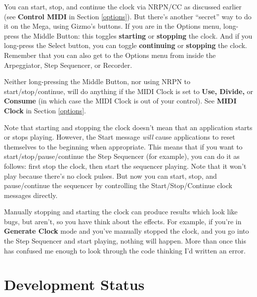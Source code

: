 \documentclass{article}
\begin{document}
		You can start, stop, and continue the clock via NRPN/CC as discussed earlier (see {\bf Control MIDI} in Section \ref{options}).   But there's another ``secret'' way to do it on the Mega, using Gizmo's buttons.  If you are in the Options menu, long-press the Middle Button: this toggles {\bf starting} or {\bf stopping} the clock.  And if you long-press the Select button, you can toggle {\bf continuing} or {\bf stopping} the clock.  Remember that you can also get to the Options menu from inside the Arpeggiator, Step Sequencer, or Recorder.
		
		Neither long-pressing the Middle Button, nor using NRPN to start/stop/continue, will do anything if the MIDI Clock is set to {\bf Use, Divide,} or {\bf Consume} (in which case the MIDI Clock is out of your control).  See {\bf MIDI Clock} in Section \ref{options}.
				
		Note that starting and stopping the clock doesn't mean that an application starts or stops playing.  However, the Start message {\it will} cause applications to reset themselves to the beginning when appropriate.   This means that if you want to start/stop/pause/continue the Step Sequencer (for example), you can do it as follows: first stop the clock, then start the sequencer playing.  Note that it won't play because there's no clock pulses.  But now you can start, stop, and pause/continue the sequencer by controlling the Start/Stop/Continue clock messages directly.
		
		Manually stopping and starting the clock can produce results which look like bugs, but aren't, so you have think about the effects.  For example, if you're in {\bf Generate Clock} mode and you've manually stopped the clock, and you go into the Step Sequencer and start playing, nothing will happen. More than once this has confused me enough to look through the code thinking I'd written an error.
		

\section{Development Status}
\end{document}
